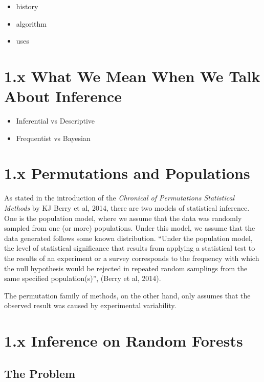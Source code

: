 \documentclass[12pt,twoside]{reedthesis}
\begin{document}
  \begin{itemize}
  \item
    history
  \item
    algorithm
  \item
    uses
  \end{itemize}
  
  \section{1.x What We Mean When We Talk About
  Inference}\label{x-what-we-mean-when-we-talk-about-inference}
  
  \begin{itemize}
  \item
    Inferential vs Descriptive
  \item
    Frequentist vs Bayesian
  \end{itemize}
  
  \section{1.x Permutations and
  Populations}\label{x-permutations-and-populations}
  
  As stated in the introduction of the \emph{Chronical of Permutations
  Statistical Methods} by KJ Berry et al, 2014, there are two models of
  statistical inference. One is the population model, where we assume that
  the data was randomly sampled from one (or more) populations. Under this
  model, we assume that the data generated follows some known
  distribution. ``Under the population model, the level of statistical
  significance that results from applying a statistical test to the
  results of an experiment or a survey corresponds to the frequency with
  which the null hypothesis would be rejected in repeated random samplings
  from the same specified population(s)'', (Berry et al, 2014).
  
  The permutation family of methods, on the other hand, only assumes that
  the observed result was caused by experimental variability.
  
  \section{1.x Inference on Random
  Forests}\label{x-inference-on-random-forests}
  
  \subsection{The Problem}\label{the-problem}
  
\end{document}
